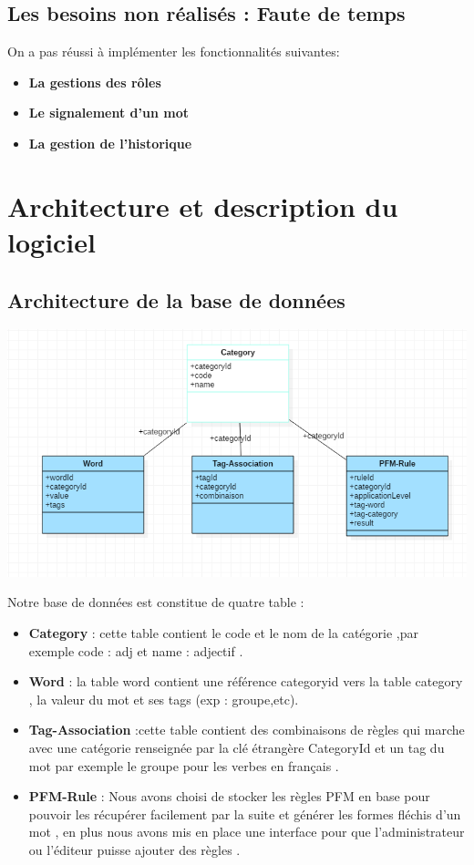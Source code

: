 \documentclass[12pt,a4paper]{article}
\begin{document}
\subsection{Les besoins non réalisés : Faute de temps}

On a pas réussi à implémenter les  fonctionnalités suivantes:

\begin{itemize}
\item \textbf{La gestions des rôles }
\item \textbf{Le signalement d'un mot}
\item \textbf{La gestion de l'historique}
\end{itemize}
\section{Architecture et description du logiciel}
\subsection{Architecture de la base de données }

\includegraphics[width=150mm]{img/basefinal.PNG}

Notre base de données est constitue de quatre table : 
\begin{itemize}
\item \textbf{Category} : cette table contient le code et le nom de la catégorie ,par exemple code : adj et name : adjectif .
\item \textbf{Word} : la table word contient une référence categoryid vers la table category , la valeur du mot et ses tags (exp : groupe,etc).
\item \textbf{Tag-Association} :cette table contient des combinaisons de règles qui marche avec une catégorie renseignée par la clé étrangère CategoryId  et un tag du mot par exemple le groupe pour les verbes en français .
\item \textbf{PFM-Rule} : Nous avons choisi de stocker les règles PFM en base pour pouvoir les récupérer facilement par la suite et générer les formes fléchis d'un mot , en plus nous avons mis en place une interface pour que l'administrateur ou l'éditeur puisse ajouter des règles .

\end{itemize}
\end{document}
